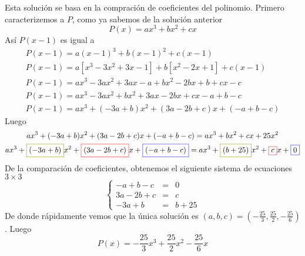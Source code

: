 \begin{section-problem}
            \begin{solution}[2]
                Esta solución se basa en la compración de coeficientes del polinomio. Primero caracterizemos a $P$, como ya sabemos de la solución anterior
                \[P(x) = a x^3 + b x^2 + cx\]
                Así $P(x - 1)$ es igual a
                \begin{gather*}
                    P(x - 1) = a \left(x - 1\right)^3 + b \left(x - 1\right)^2 + c\left(x - 1\right)\\
                    P(x - 1) = a \left[x^3 - 3 x^2 + 3 x - 1\right] + b \left[x^2 - 2x + 1\right] + c\left(x - 1\right)\\
                    P(x - 1) = a x^3 - 3a x^2 + 3a x - a + b x^2 - 2b x + b + c x - c\\
                    P(x - 1) = a x^3 - 3a x^2 + b x^2 + 3a x  - 2b x + c x  - a + b - c\\
                    P(x - 1) = a x^3 + (- 3a + b) x^2 + (3a - 2b + c) x  + (- a + b - c)
                \end{gather*}
                Luego
                \begin{gather*}
                    a x^3 + (- 3a + b) x^2 + (3a - 2b + c) x  + (- a + b - c) = a x^3 + b x^2 + cx + 25 x^2\\
                    a x^3 + \fcolorbox{olive}{white}{$(- 3a + b)$} x^2 + \fcolorbox{red}{white}{$(3a - 2b + c)$} x  + \fcolorbox{blue}{white}{$(- a + b - c)$} =
                    a x^3 + \fcolorbox{olive}{white}{$(b + 25)$} x^2 + \fcolorbox{red}{white}{$c$}x + \fcolorbox{blue}{white}{0}
                \end{gather*}
                De la comparación de coeficientes, obtenemos el siguiente sistema de ecuaciones $3 \times 3$
                \[
                    \left\{
                    \begin{array}{rcl}
                        - a +  b -  c & = & 0 \\
                        3 a - 2 b +  c & = & c \\
                        - 3a + b & = & b + 25
                    \end{array}
                    \right.
                \]
                De donde rápidamente vemos que la única solución es $(a, b, c) = \left(-\frac{25}{3}, \frac{25}{2}, -\frac{25}{6} \right)$.
                Luego
                \[\boxed{ P(x) = -\frac{25}{3}x^3 + \frac{25}{2} x^2 - \frac{25}{6} x }\]
            \end{solution}
        \end{section-problem}

